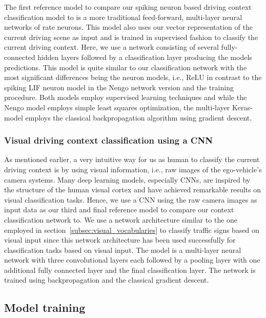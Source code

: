 The first reference model to compare our spiking neuron based driving context classification model to is a more traditional feed-forward, multi-layer neural networks of rate neurons.
This model also uses our vector representation of the current driving scene as input and is trained in supervised fashion to classify the current driving context.
Here, we use a network consisting of several fully-connected hidden layers followed by a classification layer producing the models predictions.
This model is quite similar to our classification network with the most significant differences being the neuron models, i.e., \ac{ReLU} in contrast to the spiking \ac{LIF} neuron model in the \ac{Nengo} network version and the training procedure.
Both models employ supervised learning techniques and while the \ac{Nengo} model employs simple least squares optimization, the multi-layer Keras-model employs the classical backpropagation algorithm using gradient descent.

\subsubsection{Visual driving context classification using a \acs{CNN}}%
\label{ssubsec:visual_classification_using_cnn}

As mentioned earlier, a very intuitive way for us as human to classify the current driving context is by using visual information, i.e., raw images of the ego-vehicle's camera systems.
Many deep learning models, especially \acp{CNN}, are inspired by the structure of the human visual cortex and have achieved remarkable results on visual classification tasks.
Hence, we use a \ac{CNN} using the raw camera images as input data as our third and final reference model to compare our context classification network to.
We use a network architecture similar to the one employed in section~\ref{subsec:visual_vocabularies} to classify traffic signs based on visual input since this network architecture has been used successfully for classification tasks based on visual input.
The model is a multi-layer neural network with three convolutional layers each followed by a pooling layer with one additional fully connected layer and the final classification layer.
The network is trained using backpropagation and the classical gradient descent.

\subsection{Model training}%
\label{subsec:model_training}

